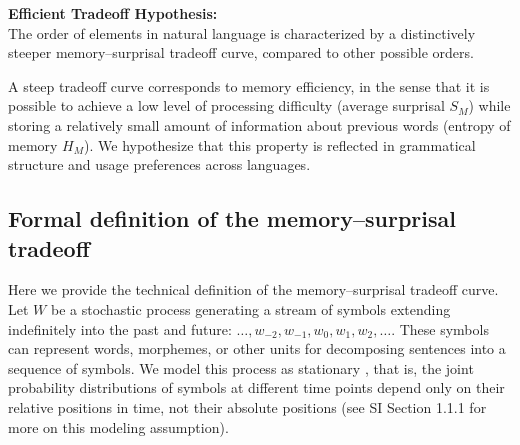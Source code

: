 \begin{adjustwidth}{6em}{6em}
\textbf{Efficient Tradeoff Hypothesis:}\\
The order of elements in natural language is characterized by a distinctively steeper memory--surprisal tradeoff curve, compared to other possible orders.
\end{adjustwidth}
A steep tradeoff curve corresponds to memory efficiency, in the sense that it is possible to achieve a low level of processing difficulty (average surprisal $S_M$) while storing a relatively small amount of information about previous words (entropy of memory $H_M$).
We hypothesize that this property is reflected in grammatical structure and usage preferences across languages.


\subsection{Formal definition of the memory--surprisal tradeoff}
\label{sec:formal-tradeoff}

Here we provide the technical definition of the memory--surprisal tradeoff curve.
Let $W$ be a stochastic process generating a stream of symbols extending indefinitely into the past and future: $\dots, w_{-2}, w_{-1}, w_0, w_{1}, w_{2}, \dots$. %
These symbols can represent words, morphemes, or other units for decomposing sentences into a sequence of symbols. 
We model this process as stationary \citep{doob1953stochastic}, that is, the joint probability distributions of symbols at different time points depend only on their relative positions in time, not their absolute positions (see SI Section 1.1.1 for more on this modeling assumption).

